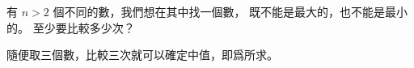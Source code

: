 
\startEXERCISE
有 $n>2$ 個不同的數，我們想在其中找一個數，
既不能是最大的，也不能是最小的。
至少要比較多少次？
\stopEXERCISE

\startANSWER
隨便取三個數，比較三次就可以確定中值，即爲所求。
\stopANSWER
